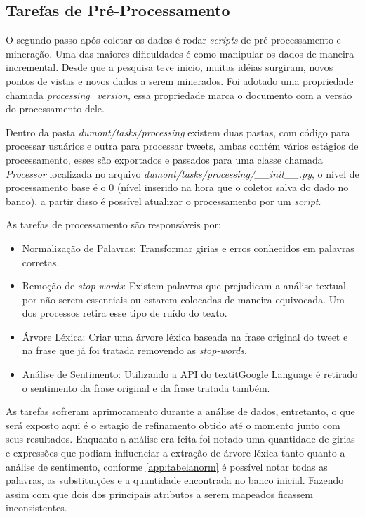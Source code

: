 \subsection{Tarefas de Pré-Processamento}
O segundo passo após coletar os dados é rodar \textit{scripts} de pré-processamento e mineração. Uma das maiores dificuldades é como manipular os dados de maneira incremental. Desde que a pesquisa teve inicio, muitas idéias surgiram, novos pontos de vistas e novos dados a serem minerados. Foi adotado uma propriedade chamada \textit{processing\_version}, essa propriedade marca o documento com a versão do processamento dele.

Dentro da pasta \textit{dumont/tasks/processing} existem duas pastas, com código para processar usuários e outra para processar tweets, ambas contém vários estágios de processamento, esses são exportados e passados para uma classe chamada \textit{Processor} localizada no arquivo \textit{dumont/tasks/processing/\_\_init\_\_.py}, o nível de processamento base é o 0 (nível inserido na hora que o coletor salva do dado no banco), a partir disso é possível atualizar o processamento por um \textit{script}.

As tarefas de processamento são responsáveis por:

\begin{itemize}
    \item Normalização de Palavras: Transformar girias e erros conhecidos em palavras corretas.
    \item Remoção de \textit{stop-words}: Existem palavras que prejudicam a análise textual por não serem essenciais ou estarem colocadas de maneira equivocada. Um dos processos retira esse tipo de ruído do texto.
    \item Árvore Léxica: Criar uma árvore léxica baseada na frase original do tweet e na frase que já foi tratada removendo as \textit{stop-words}.
    \item Análise de Sentimento: Utilizando a API do textit{Google Language} é retirado o sentimento da frase original e da frase tratada também.
\end{itemize}

As tarefas sofreram aprimoramento durante a análise de dados, entretanto, o que será exposto aqui é o estagio de refinamento obtido até o momento junto com seus resultados. Enquanto a análise era feita foi notado uma quantidade de girias e expressões que podiam influenciar a extração de árvore léxica tanto quanto a análise de sentimento, conforme \ref{app:tabelanorm} é possível notar todas as palavras, as substituições e a quantidade encontrada no banco inicial. Fazendo assim com que dois dos principais atributos a serem mapeados ficassem inconsistentes.

